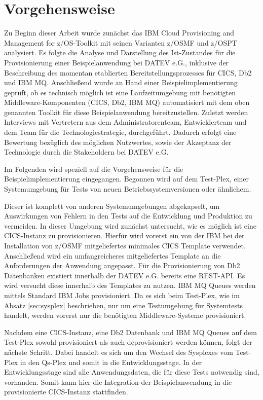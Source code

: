 \chapter{Vorgehensweise}\label{ch:vorgehensweise}
Zu Beginn dieser Arbeit wurde zunächst das \glqq IBM Cloud Provisioning and Management for z/OS\grqq-Toolkit mit seinen Varianten z/OSMF und z/OSPT analysiert.
Es folgte die Analyse und Darstellung des Ist-Zustandes für die  Provisionierung einer Beispielanwendung bei DATEV e.G., inklusive der Beschreibung des momentan etablierten Bereitstellungsprozesses für CICS, Db2 und IBM MQ.
Anschließend wurde an Hand einer Beispielimplementierung geprüft, ob es technisch möglich ist eine Laufzeitumgebung mit benötigten Middleware-Komponenten (CICS, Db2, IBM MQ) automatisiert mit dem oben genannten Toolkit für diese Beispielanwendung bereitzustellen.
Zuletzt werden Interviews mit Vertretern aus dem Administratorenteam, Entwicklerteam und dem Team für die Technologiestrategie, durchgeführt.
Dadurch erfolgt eine Bewertung bezüglich des möglichen Nutzwertes, sowie der Akzeptanz der Technologie durch die Stakeholdern bei DATEV e.G.

Im Folgenden wird speziell auf die Vorgehensweise für die Beispielimplementierung eingegangen. 
Begonnen wird auf dem Test-Plex, einer Systemumgebung für Tests von neuen Betriebssystemversionen oder ähnlichem.

Dieser ist komplett von anderen Systemumgebungen abgekapselt, um Auswirkungen von Fehlern in den Tests auf die Entwicklung und Produktion zu vermeiden.
In dieser Umgebung wird zunächst untersucht, wie es möglich ist eine CICS-Instanz zu provisionieren.
Hierfür wird vorerst ein von der IBM bei der Installation von z/OSMF mitgeliefertes minimales CICS Template verwendet.
Anschließend wird ein umfangreicheres mitgeliefertes Template an die Anforderungen der Anwendung angepasst.
Für die Provisionierung von Db2 Datenbanken existiert innerhalb der DATEV e.G. bereits eine REST-API.
Es wird versucht diese innerhalb des Templates zu nutzen.
IBM MQ Queues werden mittels Standard IBM Jobs provisioniert.
Da es sich beim Test-Plex, wie im Absatz \ref{sec:sysplex} beschrieben, nur um eine Testumgebung für Systemtests handelt, werden vorerst nur die benötigten Middleware-Systeme provisioniert.

Nachdem eine CICS-Instanz, eine Db2 Datenbank und IBM MQ Queues auf dem Test-Plex sowohl provisioniert als auch deprovisioniert werden können, folgt der nächste Schritt.
Dabei handelt es sich um den Wechsel des Sysplexes vom Test-Plex in den Qs-Plex und somit in die Entwicklungsstage.
In der Entwicklungsstage sind alle Anwendungsdaten, die für diese Tests notwendig sind, vorhanden.
Somit kann hier die Integration der Beispielanwendung in die provisionierte CICS-Instanz stattfinden.


